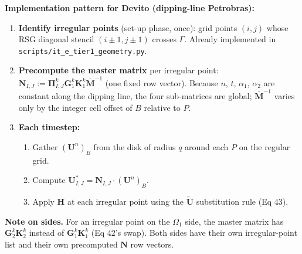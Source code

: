 \medskip

\textbf{Implementation pattern for Devito (dipping-line Petrobras):}
\begin{enumerate}
  \item \textbf{Identify irregular points} (set-up phase, once):
    grid points $(i, j)$ whose RSG diagonal stencil
    $(i \pm 1, j \pm 1)$ crosses $\Gamma$. Already implemented
    in \texttt{scripts/it\_e\_tier1\_geometry.py}.
  \item \textbf{Precompute the master matrix} per irregular point:
    $\boldsymbol{N}_{I, J} := \boldsymbol{\Pi}_{I, J}^k
    \boldsymbol{G}_1^k \boldsymbol{K}_1^k \bar{\boldsymbol{M}}^{-1}$
    (one fixed row vector). Because $n$, $t$, $\alpha_1$,
    $\alpha_2$ are constant along the dipping line, the four
    sub-matrices are global; $\bar{\boldsymbol{M}}^{-1}$ varies
    only by the integer cell offset of $B$ relative to $P$.
  \item \textbf{Each timestep:}
    \begin{enumerate}
      \item Gather $(\boldsymbol{U}^n)_B$ from the disk
        of radius $q$ around each $P$ on the regular grid.
      \item Compute $\boldsymbol{U}^*_{I, J}
        = \boldsymbol{N}_{I, J} \cdot (\boldsymbol{U}^n)_B$.
      \item Apply $\boldsymbol{H}$ at each irregular point using
        the $\tilde{\boldsymbol{U}}$ substitution rule (Eq 43).
    \end{enumerate}
\end{enumerate}

\medskip

\textbf{Note on sides.} For an irregular point on the $\Omega_1$
side, the master matrix has $\boldsymbol{G}_2^k \boldsymbol{K}_2^k$
instead of $\boldsymbol{G}_1^k \boldsymbol{K}_1^k$ (Eq 42's swap).
Both sides have their own irregular-point list and their own
precomputed $\boldsymbol{N}$ row vectors.
